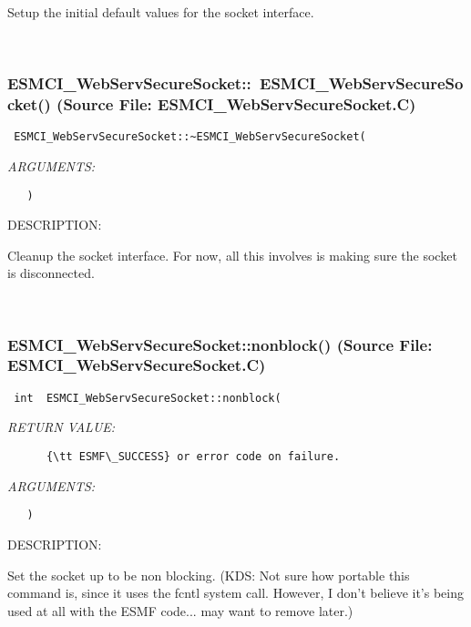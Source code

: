       Setup the initial default values for the socket interface.
   
 
\mbox{}\hrulefill\
 
\subsubsection{ESMCI\_WebServSecureSocket::~ESMCI\_WebServSecureSocket() (Source File: ESMCI\_WebServSecureSocket.C)}


  
\begin{verbatim} ESMCI_WebServSecureSocket::~ESMCI_WebServSecureSocket(\end{verbatim}{\em ARGUMENTS:}
\begin{verbatim}   )\end{verbatim}
{\sf DESCRIPTION:\\ }


      Cleanup the socket interface.  For now, all this involves is making
      sure the socket is disconnected.
   
 
\mbox{}\hrulefill\
 
\subsubsection{ESMCI\_WebServSecureSocket::nonblock() (Source File: ESMCI\_WebServSecureSocket.C)}


  
\begin{verbatim} int  ESMCI_WebServSecureSocket::nonblock(\end{verbatim}{\em RETURN VALUE:}
\begin{verbatim}      {\tt ESMF\_SUCCESS} or error code on failure.\end{verbatim}{\em ARGUMENTS:}
\begin{verbatim}   )\end{verbatim}
{\sf DESCRIPTION:\\ }


      Set the socket up to be non blocking.
      (KDS: Not sure how portable this command is, since it uses the fcntl
            system call.  However, I don't believe it's being used at all
            with the ESMF code... may want to remove later.)
   

